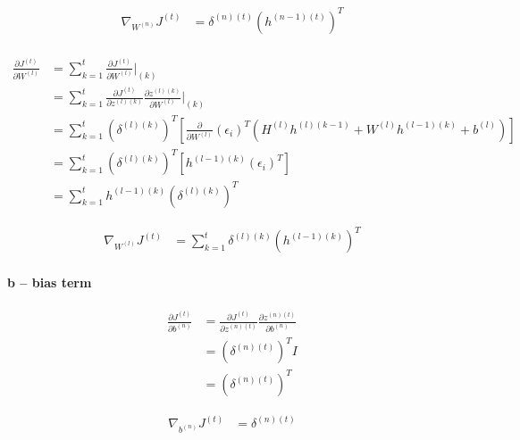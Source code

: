 \documentclass{article}
\begin{document}
	\begin{equation}
	\begin{aligned}
	\nabla_{W^{(n)}} J^{(t)} &= \delta^{(n)(t)} (h^{(n-1)(t)})^T\\
	\end{aligned}
	\end{equation}
	
	\begin{equation}
	\begin{aligned}
		\frac{\partial J^{(t)}}{\partial W^{(l)}} &= \sum_{k=1}^{t} \frac{\partial J^{(t)}}{\partial W^{(l)}}\bigg|_{(k)}  \\
		&= \sum_{k=1}^{t}
		\frac{\partial J^{(t)}}{\partial z^{(l)(k)}} 
		\frac{\partial z^{(l)(k)}}{\partial W^{(l)}}\bigg|_{(k)} \\
		&= \sum_{k=1}^{t}
		(\delta^{(l)(k)})^T \left[\frac{\partial }{\partial W^{(l)}}(\epsilon_i)^T (H^{(l)} h^{(l)(k-1)} + W^{(l)} h^{(l-1)(k)} + b^{(l)})\right] \\
		&= \sum_{k=1}^{t}
		(\delta^{(l)(k)})^T \left[h^{(l-1)(k)} (\epsilon_i)^T\right]\\	
		&= \sum_{k=1}^{t} h^{(l-1)(k)} (\delta^{(l)(k)})^T
	\end{aligned}
	\end{equation}
	
	\begin{equation}
	\begin{aligned}
		\nabla_{W^{(l)}} J^{(t)} &= \sum_{k=1}^{t} \delta^{(l)(k)}  (h^{(l-1)(k)})^T
	\end{aligned}
	\end{equation}	
		
	\paragraph{b -- bias term}
	\begin{equation}
	\begin{aligned}
	\frac{\partial J^{(t)}}{\partial b^{(n)}} &= \frac{\partial J^{(t)}}{\partial z^{(n)(t)}} 
	\frac{\partial z^{(n)(t)}}{\partial b^{(n)}} \\
	&= (\delta^{(n)(t)})^T I \\
	&= (\delta^{(n)(t)})^T 
	\end{aligned}
	\end{equation}
	
	\begin{equation}
	\begin{aligned}
	\nabla_{b^{(n)}} J^{(t)} &= \delta^{(n)(t)} 
	\end{aligned}
	\end{equation}
	
\end{document}
